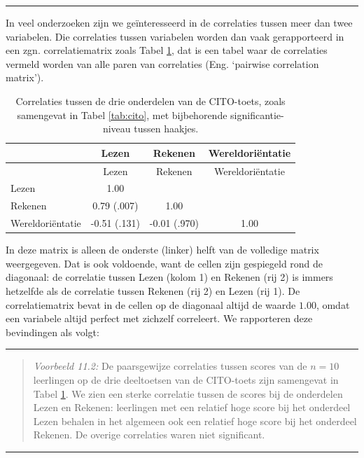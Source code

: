 \documentclass[
]{book}
\begin{document}
\begin{center}\rule{0.5\linewidth}{0.5pt}\end{center}

In veel onderzoeken zijn we geïnteresseerd in de correlaties tussen meer
dan twee variabelen. Die correlaties tussen variabelen worden dan vaak
gerapporteerd in een zgn. correlatiematrix zoals
Tabel \ref{tab:cito-correlaties}, dat is een tabel waar de correlaties
vermeld worden van alle paren van correlaties (Eng. `pairwise
correlation matrix').

\begin{longtable}[]{@{}lccc@{}}
\caption{\label{tab:cito-correlaties} Correlaties tussen de drie onderdelen van de CITO-toets, zoals
samengevat in Tabel \ref{tab:cito}, met bijbehorende significantie-niveau
tussen haakjes.}\tabularnewline
\toprule
& Lezen & Rekenen & Wereldoriëntatie\tabularnewline
\midrule
\endfirsthead
\toprule
& Lezen & Rekenen & Wereldoriëntatie\tabularnewline
\midrule
\endhead
Lezen & 1.00 & &\tabularnewline
Rekenen & 0.79 (.007) & 1.00 &\tabularnewline
Wereldoriëntatie & -0.51 (.131) & -0.01 (.970) & 1.00\tabularnewline
\bottomrule
\end{longtable}

In deze matrix is alleen de onderste (linker) helft van de volledige
matrix weergegeven. Dat is ook voldoende, want de cellen zijn gespiegeld
rond de diagonaal: de correlatie tussen Lezen (kolom 1) en Rekenen (rij
2) is immers hetzelfde als de correlatie tussen Rekenen (rij 2) en Lezen
(rij 1). De correlatiematrix bevat in de cellen op de diagonaal altijd
de waarde \(1.00\), omdat een variabele altijd perfect met zichzelf
correleert. We rapporteren deze bevindingen als volgt:

\begin{center}\rule{0.5\linewidth}{0.5pt}\end{center}

\begin{quote}
\emph{Voorbeeld 11.2:} De
paarsgewijze correlaties tussen scores van de \(n=10\) leerlingen op de
drie deeltoetsen van de CITO-toets zijn samengevat in
Tabel \ref{tab:cito-correlaties}. We zien een sterke correlatie tussen
de scores bij de onderdelen Lezen en Rekenen: leerlingen met een
relatief hoge score bij het onderdeel Lezen behalen in het algemeen ook
een relatief hoge score bij het onderdeel Rekenen. De overige
correlaties waren niet significant.
\end{quote}

\begin{center}\rule{0.5\linewidth}{0.5pt}\end{center}
\end{document}
